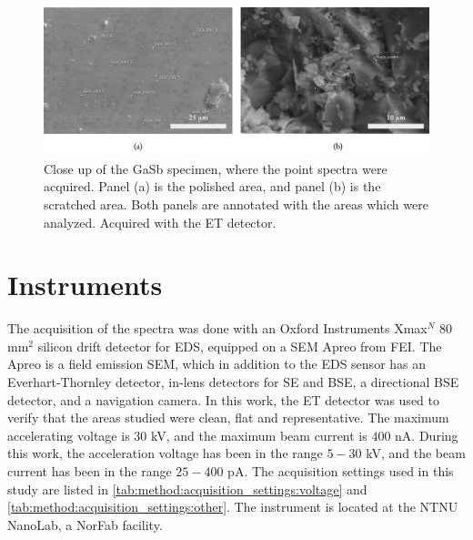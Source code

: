 \begin{figure}[htbp]
    \centering
    \includegraphics[width=.99\textwidth]{figures/SE_images/GaSb_close.jpg}
    \caption{
        Close up of the GaSb specimen, where the point spectra were acquired.
        Panel (a) is the polished area, and panel (b) is the scratched area.
        Both panels are annotated with the areas which were analyzed.
        Acquired with the ET detector.
    }
    \label{fig:SE_images:GaSb}
\end{figure}


















\section{Instruments}
\label{method:instruments}

The acquisition of the spectra was done with an Oxford Instruments Xmax$^N$ $80$ mm$^2$ silicon drift detector for EDS, equipped on a SEM Apreo from FEI.
The Apreo is a field emission SEM, which in addition to the EDS sensor has an Everhart-Thornley detector, in-lens detectors for SE and BSE, a directional BSE detector, and a navigation camera.
In this work, the ET detector was used to verify that the areas studied were clean, flat and representative.
The maximum accelerating voltage is $30$ kV, and the maximum beam current is $400$ nA.
During this work, the acceleration voltage has been in the range $5-30$ kV, and the beam current has been in the range $25-400$ pA.
The acquisition settings used in this study are listed in \cref{tab:method:acquisition_settings:voltage} and \cref{tab:method:acquisition_settings:other}.
The instrument is located at the NTNU NanoLab, a NorFab facility.


